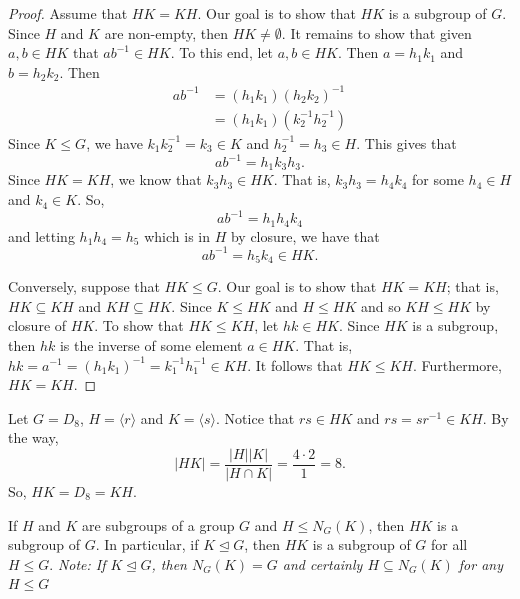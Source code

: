 \begin{proof}
Assume that \( HK = KH  \). Our goal is to show that \( HK  \) is a subgroup of \( G  \). Since \( H  \) and \( K  \) are non-empty, then \( HK \neq \emptyset \). It remains to show that given \( a,b \in H K  \) that \( a b^{-1} \in HK \). To this end, let \( a,b  \in H  K  \). Then \( a = {h}_{1} {k}_{1} \) and \( b = {h}_{2} {k }_{2} \). Then 
\begin{align*}
    a b^{-1} &= ({h}_{1} {k}_{1}) ({h}_{2} {k}_{2})^{-1} \\
             &= ({h}_{1} {k}_{1}) ({k}_{2}^{-1} {h}_{2}^{-1}) 
\end{align*}
Since \( K \leq G  \), we have \( {k}_{1} {k}_{2}^{-1} = {k}_{3} \in K  \) and \( {h}_{2}^{-1} = {h}_{3} \in H \). This gives that 
\[ a b^{-1} = {h}_{1} {k}_{3} {h}_{3}. \]
Since \( H K = K H \), we know that \( {k}_{3} {h}_{3} \in HK \). That is, \( {k}_{3} {h}_{3} = {h}_{4} {k}_{4}  \) for some \( {h}_{4} \in H  \) and \( {k}_{4} \in K  \). So, 
\[  a b^{-1} = {h}_{1} {h}_{4} {k}_{4} \]
and letting \( {h}_{1} {h}_{4} = {h}_{5} \) which is in \( H  \) by closure, we have that 
\[  a b^{-1} = {h}_{5} {k}_{4} \in HK.  \]

Conversely, suppose that \( H K \leq G  \). Our goal is to show that \( HK = K H  \); that is, \( HK \subseteq  KH   \) and \( KH \subseteq  HK \). Since \( K \leq HK  \) and \( H \leq HK  \) and so \( KH \leq HK \) by closure of \( H K  \). To show that \( HK \leq KH  \), let \( hk \in HK \). Since \( HK  \) is a subgroup, then \( hk  \) is the inverse of some element \( a \in HK \). That is, \( h k = a^{-1} = ({h}_{1} {k}_{1})^{-1} = {k}_{1}^{-1} {h}_{1}^{-1} \in KH \). It follows that \( HK  \leq KH \). Furthermore, \( HK = KH \). 
\end{proof}


\begin{eg}
    Let \( G = {D}_{8}  \), \( H = \langle  r  \rangle \) and \( K  = \langle   s  \rangle \). Notice that \( rs \in H K \) and \( rs = s r^{-1} \in KH  \). By the way, 
    \[ | H K |  = \frac{ | H  |  | K  |  }{ | H \cap  K |   }  = \frac{ 4 \cdot 2  }{  1  }  = 8.  \] 
    So, \( HK = {D}_{8}  = KH  \).
\end{eg}

\begin{corollary}
If \( H  \) and \( K  \) are subgroups of a group \( G  \) and \( H \leq {N}_{G}(K) \), then \( H K  \) is a subgroup of \( G  \). In particular, if \( K \trianglelefteq G  \), then \( H K  \) is a subgroup of \( G  \) for all \( H \leq G  \). \textit{Note: If \( K \trianglelefteq G  \), then \( {N}_{G}(K) = G  \) and certainly \( H \subseteq  {N}_{G}(K) \)   for any \( H \leq G  \)}
\end{corollary}

